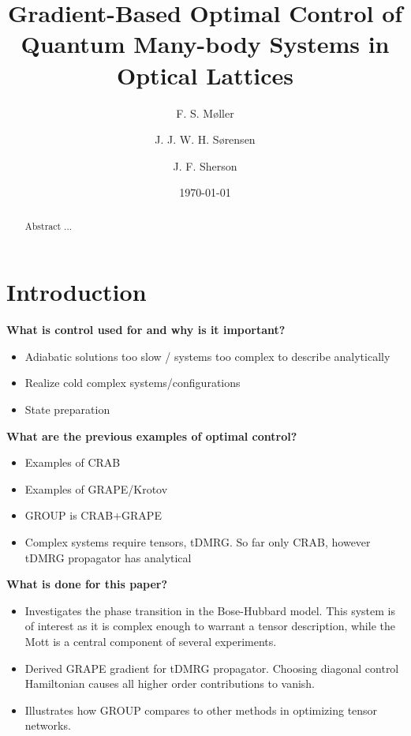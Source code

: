 \documentclass[%
 reprint,
 amsmath,amssymb,
 aps,
pra,
]{revtex4-1}
\begin{document}

\title{Gradient-Based Optimal Control of Quantum Many-body Systems in Optical Lattices}%

\author{F. S. M\o ller}
\author{J. J. W. H. S\o rensen}
\author{J. F. Sherson}
\date{\today}%

\begin{abstract}
Abstract ...


\end{abstract}

\maketitle

\section{Introduction}

\textbf{What is control used for and why is it important?}
\begin{itemize}
	\item
	Adiabatic solutions too slow / systems too complex to describe analytically

	\item
	Realize cold complex systems/configurations
	
	\item
	State preparation 
\end{itemize}


\textbf{What are the previous examples of optimal control?}
\begin{itemize}
	\item
	Examples of CRAB
	
	\item
	Examples of GRAPE/Krotov
	
	\item
	GROUP is CRAB+GRAPE
	
	\item
	Complex systems require tensors, tDMRG. So far only CRAB, however tDMRG propagator has analytical  
\end{itemize}


\textbf{What is done for this paper?}
\begin{itemize}
	\item
	Investigates the phase transition in the Bose-Hubbard model. This system is of interest as it is complex enough to warrant a tensor description, while the Mott is a central component of several experiments.

	\item
	Derived GRAPE gradient for tDMRG propagator. Choosing diagonal control Hamiltonian causes all higher order contributions to vanish.
	
	\item 
	Illustrates how GROUP compares to other methods in optimizing tensor networks.
\end{itemize}
\end{document}
